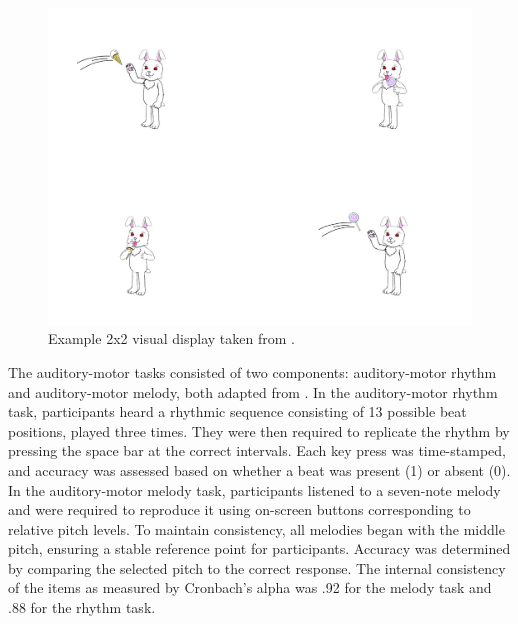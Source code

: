 \begin{figure}
    \centering
    \includegraphics[width=\textwidth,height=\textheight,keepaspectratio]{viz/Fig1-Geetal.jpg}
    \caption{Example 2x2 visual display taken from \textcite{ge2021a}.}
    \label{fig:sampleslide}
\end{figure}


The auditory-motor tasks consisted of two components: auditory-motor rhythm and auditory-motor melody, both adapted from \textcite{Kachlicka_Saito_Tierney_2019}. In the auditory-motor rhythm task, participants heard a rhythmic sequence consisting of 13 possible beat positions, played three times. They were then required to replicate the rhythm by pressing the space bar at the correct intervals. Each key press was time-stamped, and accuracy was assessed based on whether a beat was present (1) or absent (0). In the auditory-motor melody task, participants listened to a seven-note melody and were required to reproduce it using on-screen buttons corresponding to relative pitch levels. To maintain consistency, all melodies began with the middle pitch, ensuring a stable reference point for participants. Accuracy was determined by comparing the selected pitch to the correct response. The internal consistency of the items as measured by Cronbach's alpha was .92 for the melody task and .88 for the rhythm task.

